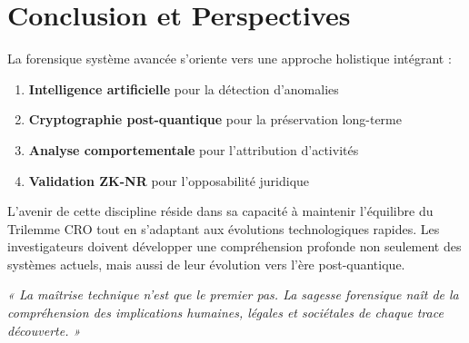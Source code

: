 \section{Conclusion et Perspectives}

La forensique système avancée s'oriente vers une approche holistique intégrant :

\begin{enumerate}
\item \textbf{Intelligence artificielle} pour la détection d'anomalies
\item \textbf{Cryptographie post-quantique} pour la préservation long-terme
\item \textbf{Analyse comportementale} pour l'attribution d'activités
\item \textbf{Validation ZK-NR} pour l'opposabilité juridique
\end{enumerate}

L'avenir de cette discipline réside dans sa capacité à maintenir l'équilibre du Trilemme CRO tout en s'adaptant aux évolutions technologiques rapides. Les investigateurs doivent développer une compréhension profonde non seulement des systèmes actuels, mais aussi de leur évolution vers l'ère post-quantique.

\textit{« La maîtrise technique n'est que le premier pas. La sagesse forensique naît de la compréhension des implications humaines, légales et sociétales de chaque trace découverte. »}